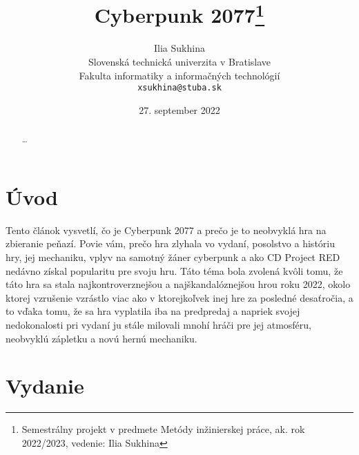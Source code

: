 \documentclass[10pt,twoside,slovak,a4paper]{article}
\title{Cyberpunk 2077\thanks{Semestrálny projekt v predmete Metódy inžinierskej práce, ak. rok 2022/2023, vedenie: Ilia Sukhina}} %
\author{Ilia Sukhina\\[2pt]
	{\small Slovenská technická univerzita v Bratislave}\\
	{\small Fakulta informatiky a informačných technológií}\\
	{\small \texttt{xsukhina@stuba.sk}}
	}
\date{\small 27. september 2022} %
\begin{document}
\maketitle

\begin{abstract}
\ldots
\end{abstract}



\section{Úvod}

Tento článok vysvetlí, čo je Cyberpunk 2077 a prečo je to neobvyklá hra na zbieranie peňazí. Povie vám, prečo hra zlyhala vo vydaní, posolstvo a históriu hry, jej mechaniku, vplyv na samotný žáner cyberpunk a ako CD Project RED nedávno získal popularitu pre svoju hru. Táto téma bola zvolená kvôli tomu, že táto hra sa stala najkontroverznejšou a najškandalóznejšou hrou roku 2022, okolo ktorej vzrušenie vzrástlo viac ako v ktorejkoľvek inej hre za posledné desaťročia, a to vďaka tomu, že sa hra vyplatila iba na predpredaj a napriek svojej nedokonalosti pri vydaní ju stále milovali mnohí hráči pre jej atmosféru, neobvyklú zápletku a novú hernú mechaniku.


\section{Vydanie} \label{vydanie}
\end{document}
